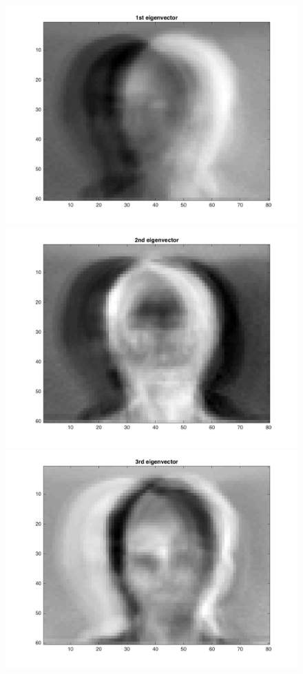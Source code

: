 \documentclass{article}
\begin{document}
\begin{figure}[H]
\includegraphics[scale =.4]{report7_1}
\includegraphics[scale =.4]{report7_2}
\includegraphics[scale =.4]{report7_3}

\end{figure}
\end{document}
